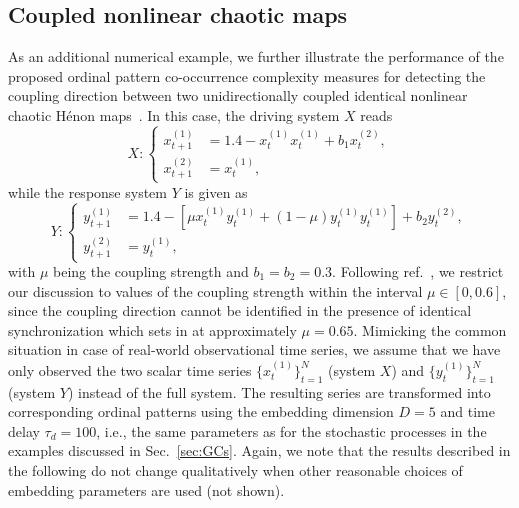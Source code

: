 \documentclass[12pt,aip,cha,reprint,nofootinbib]{revtex4-1}
\begin{document}
\subsection{Coupled nonlinear chaotic maps} \label{sec:henon}

As an additional numerical example, we further illustrate the performance of the proposed ordinal pattern co-occurrence complexity measures for detecting the coupling direction between two unidirectionally coupled identical nonlinear chaotic H\'enon maps~\cite{RomanoPRE2007}. In this case, the driving system $X$ reads 
\begin{equation} \label{eq:HX}
X: \left \{ \begin{aligned}
x_{t + 1}^{(1)} &= 1.4 - x^{(1)}_t x^{(1)}_t + b_1 x^{(2)}_t, \\
x_{t + 1}^{(2)} &= x_{t}^{(1)},
\end{aligned}
\right.
\end{equation}
while the response system $Y$ is given as 
\begin{equation} \label{eq:HY}
Y: \left \{ \begin{aligned}
y^{(1)}_{t + 1} &= 1.4 - [\mu x^{(1)}_t y^{(1)}_t+ (1 - \mu) y^{(1)}_t y^{(1)}_t] + b_2 y^{(2)}_t, \\
y^{(2)}_{t + 1} &= y^{(1)}_t,
\end{aligned}
\right.
\end{equation}
with $\mu$ being the coupling strength and $b_1 = b_2 = 0.3$. Following ref.~\cite{RomanoPRE2007}, we restrict our discussion to values of the coupling strength within the interval $\mu \in [0, 0.6]$, since the coupling direction cannot be identified in the presence of identical synchronization which sets in at approximately $\mu = 0.65$. Mimicking the common situation in case of real-world observational time series, we assume that we have only observed the two scalar time series $\{ x^{(1)}_t \}_{t=1}^{N}$ (system $X$) and $\{ y^{(1)}_t  \}_{t=1}^{N}$ (system $Y$) instead of the full system. The resulting series are transformed into corresponding ordinal patterns using the embedding dimension $D = 5$ and time delay $\tau_d = 100$, i.e., the same parameters as for the stochastic processes in the examples discussed in Sec.~\ref{sec:GCs}. Again, we note that the results described in the following do not change qualitatively when other reasonable choices of embedding parameters are used (not shown). 
\end{document}
